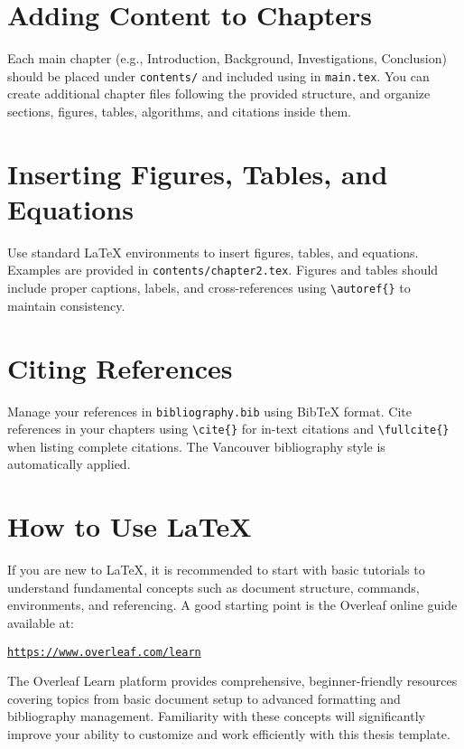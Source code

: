 \section{Adding Content to Chapters}
\begin{paragraph}
Each main chapter (e.g., Introduction, Background, Investigations, Conclusion) should be placed under \texttt{contents/} and included using \verb|| in \texttt{main.tex}. You can create additional chapter files following the provided structure, and organize sections, figures, tables, algorithms, and citations inside them.
\end{paragraph}

\section{Inserting Figures, Tables, and Equations}
\begin{paragraph}
Use standard {\LaTeX} environments to insert figures, tables, and equations. Examples are provided in \texttt{contents/chapter2.tex}. Figures and tables should include proper captions, labels, and cross-references using \verb|\autoref{}| to maintain consistency.
\end{paragraph}

\section{Citing References}
\begin{paragraph}
Manage your references in \texttt{bibliography.bib} using BibTeX format. Cite references in your chapters using \verb|\cite{}| for in-text citations and \verb|\fullcite{}| when listing complete citations. The Vancouver bibliography style is automatically applied.
\end{paragraph}

\section{How to Use {\LaTeX}}
\begin{paragraph}
If you are new to {\LaTeX}, it is recommended to start with basic tutorials to understand fundamental concepts such as document structure, commands, environments, and referencing. A good starting point is the Overleaf online guide available at:

\begin{center}
\href{https://www.overleaf.com/learn}{\texttt{https://www.overleaf.com/learn}}
\end{center}

The Overleaf Learn platform provides comprehensive, beginner-friendly resources covering topics from basic document setup to advanced formatting and bibliography management. Familiarity with these concepts will significantly improve your ability to customize and work efficiently with this thesis template.
\end{paragraph}

